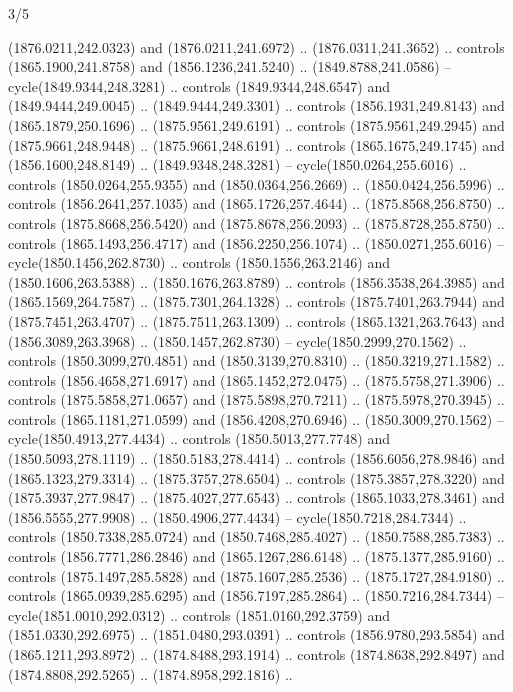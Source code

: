 \begin{flagdescription}{3/5}
\begin{scope}[xshift=0.5\flaglength,yshift=0.5\flagwidth,scale=\flagwidth/99]
\begin{scope}[y=0.8pt, x=0.8pt, yscale=-0.20628, xscale=0.20628,shift={(-500,-300)}]
\begin{scope}[cm={{0.79646,0.0,0.0,0.7753,(100.0721,273.79617)}}]
\begin{scope}[cm={{1.1028,0.0,0.0,1.08434,(-41.46868,-11.26981)}}]
  (1876.0211,242.0323) and (1876.0211,241.6972) .. (1876.0311,241.3652) ..
  controls (1865.1900,241.8758) and (1856.1236,241.5240) .. (1849.8788,241.0586)
  -- cycle(1849.9344,248.3281) .. controls (1849.9344,248.6547) and
  (1849.9444,249.0045) .. (1849.9444,249.3301) .. controls (1856.1931,249.8143)
  and (1865.1879,250.1696) .. (1875.9561,249.6191) .. controls
  (1875.9561,249.2945) and (1875.9661,248.9448) .. (1875.9661,248.6191) ..
  controls (1865.1675,249.1745) and (1856.1600,248.8149) .. (1849.9348,248.3281)
  -- cycle(1850.0264,255.6016) .. controls (1850.0264,255.9355) and
  (1850.0364,256.2669) .. (1850.0424,256.5996) .. controls (1856.2641,257.1035)
  and (1865.1726,257.4644) .. (1875.8568,256.8750) .. controls
  (1875.8668,256.5420) and (1875.8678,256.2093) .. (1875.8728,255.8750) ..
  controls (1865.1493,256.4717) and (1856.2250,256.1074) .. (1850.0271,255.6016)
  -- cycle(1850.1456,262.8730) .. controls (1850.1556,263.2146) and
  (1850.1606,263.5388) .. (1850.1676,263.8789) .. controls (1856.3538,264.3985)
  and (1865.1569,264.7587) .. (1875.7301,264.1328) .. controls
  (1875.7401,263.7944) and (1875.7451,263.4707) .. (1875.7511,263.1309) ..
  controls (1865.1321,263.7643) and (1856.3089,263.3968) .. (1850.1457,262.8730)
  -- cycle(1850.2999,270.1562) .. controls (1850.3099,270.4851) and
  (1850.3139,270.8310) .. (1850.3219,271.1582) .. controls (1856.4658,271.6917)
  and (1865.1452,272.0475) .. (1875.5758,271.3906) .. controls
  (1875.5858,271.0657) and (1875.5898,270.7211) .. (1875.5978,270.3945) ..
  controls (1865.1181,271.0599) and (1856.4208,270.6946) .. (1850.3009,270.1562)
  -- cycle(1850.4913,277.4434) .. controls (1850.5013,277.7748) and
  (1850.5093,278.1119) .. (1850.5183,278.4414) .. controls (1856.6056,278.9846)
  and (1865.1323,279.3314) .. (1875.3757,278.6504) .. controls
  (1875.3857,278.3220) and (1875.3937,277.9847) .. (1875.4027,277.6543) ..
  controls (1865.1033,278.3461) and (1856.5555,277.9908) .. (1850.4906,277.4434)
  -- cycle(1850.7218,284.7344) .. controls (1850.7338,285.0724) and
  (1850.7468,285.4027) .. (1850.7588,285.7383) .. controls (1856.7771,286.2846)
  and (1865.1267,286.6148) .. (1875.1377,285.9160) .. controls
  (1875.1497,285.5828) and (1875.1607,285.2536) .. (1875.1727,284.9180) ..
  controls (1865.0939,285.6295) and (1856.7197,285.2864) .. (1850.7216,284.7344)
  -- cycle(1851.0010,292.0312) .. controls (1851.0160,292.3759) and
  (1851.0330,292.6975) .. (1851.0480,293.0391) .. controls (1856.9780,293.5854)
  and (1865.1211,293.8972) .. (1874.8488,293.1914) .. controls
  (1874.8638,292.8497) and (1874.8808,292.5265) .. (1874.8958,292.1816) ..

\end{scope}
\end{scope}
\end{scope}
\end{scope}
\end{flagdescription}
